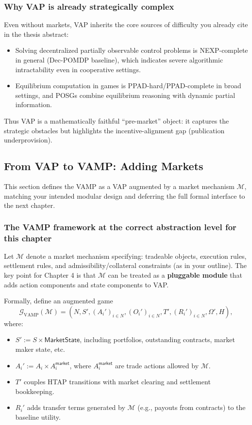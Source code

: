 \subsubsection{Why VAP is already strategically complex}

Even without markets, VAP inherits the core sources of difficulty you already cite in the thesis abstract:

\begin{itemize}
\item Solving decentralized partially observable control problems is NEXP-complete in general (Dec-POMDP baseline), which indicates severe algorithmic intractability even in cooperative settings.
\item Equilibrium computation in games is PPAD-hard/PPAD-complete in broad settings, and POSGs combine equilibrium reasoning with dynamic partial information.
\end{itemize}

Thus VAP is a mathematically faithful ``pre-market'' object: it captures the strategic obstacles but highlights the incentive-alignment gap (publication underprovision).

\subsection{From VAP to VAMP: Adding Markets}

This section defines the VAMP as a VAP augmented by a market mechanism \(\mathcal{M}\), matching your intended modular design and deferring the full formal interface to the next chapter.

\subsubsection{The VAMP framework at the correct abstraction level for this chapter}

Let \(\mathcal{M}\) denote a market mechanism specifying: tradeable objects, execution rules, settlement rules, and admissibility/collateral constraints (as in your outline). The key point for Chapter 4 is that \(\mathcal{M}\) can be treated as a \textbf{pluggable module} that adds action components and state components to VAP.

Formally, define an augmented game
\[
\mathcal{G}_{\mathrm{VAMP}}(\mathcal{M}) = (N, S', (A_i')_{i\in N}, (O_i')_{i\in N}, T', (R_i')_{i\in N}, \Omega', H),
\]
where:

\begin{itemize}
\item \(S' := S \times \mathsf{MarketState}\), including portfolios, outstanding contracts, market maker state, etc.
\item \(A_i' := A_i \times A_i^{\mathsf{market}}\), where \(A_i^{\mathsf{market}}\) are trade actions allowed by \(\mathcal{M}\).
\item \(T'\) couples HTAP transitions with market clearing and settlement bookkeeping.
\item \(R_i'\) adds transfer terms generated by \(\mathcal{M}\) (e.g., payouts from contracts) to the baseline utility.
\end{itemize}

